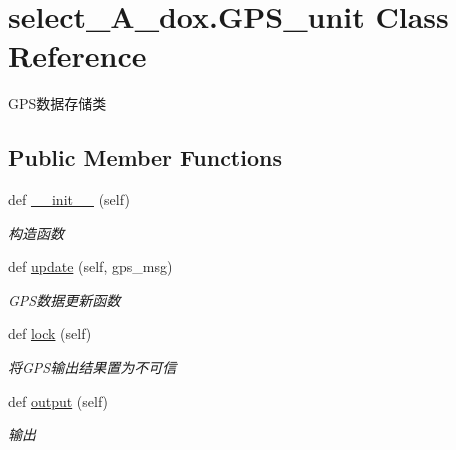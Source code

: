 \hypertarget{classselect___a__dox_1_1_g_p_s__unit}{}\section{select\+\_\+\+A\+\_\+dox.\+G\+P\+S\+\_\+unit Class Reference}
\label{classselect___a__dox_1_1_g_p_s__unit}


G\+P\+S数据存储类  


\subsection*{Public Member Functions}
\begin{DoxyCompactItemize}
\item 
def \hyperlink{classselect___a__dox_1_1_g_p_s__unit_a0199c8696c6358bb2aab2ae49f1c29d2}{\+\_\+\+\_\+init\+\_\+\+\_\+} (self)
\begin{DoxyCompactList}\small\item\em 构造函数 \end{DoxyCompactList}\item 
def \hyperlink{classselect___a__dox_1_1_g_p_s__unit_ae49eca50eb5cebf93140174f26de28bc}{update} (self, gps\+\_\+msg)
\begin{DoxyCompactList}\small\item\em G\+P\+S数据更新函数 \end{DoxyCompactList}\item 
def \hyperlink{classselect___a__dox_1_1_g_p_s__unit_a5a2546b2fa4222e555b51a5c2e23c046}{lock} (self)
\begin{DoxyCompactList}\small\item\em 将\+G\+P\+S输出结果置为不可信 \end{DoxyCompactList}\item 
def \hyperlink{classselect___a__dox_1_1_g_p_s__unit_a8583eb7e0a8c7caf49ac0e83bf4a11e8}{output} (self)
\begin{DoxyCompactList}\small\item\em 输出 \end{DoxyCompactList}\end{DoxyCompactItemize}
